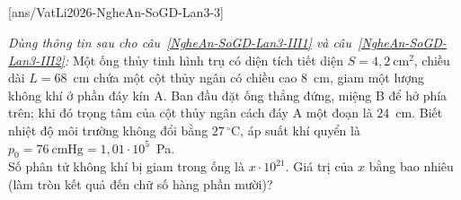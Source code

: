 	\subsection*{}
	\setcounter{ex}{0}
	[ans/VatLi2026-NgheAn-SoGD-Lan3-3]

	\begin{ex}%
		\label{NgheAn-SoGD-Lan3-III1}\textit{Dùng thông tin sau cho câu~\ref{NgheAn-SoGD-Lan3-III1} và câu~\ref{NgheAn-SoGD-Lan3-III2}:} Một ống thủy tinh hình trụ có diện tích tiết diện $S=4{,}2~\text{cm}^2$, chiều dài $L=68$~cm chứa một cột thủy ngân có chiều cao $8$~cm, giam một lượng không khí ở phần đáy kín A. Ban đầu đặt ống thẳng đứng, miệng B để hở phía trên; khi đó trọng tâm của cột thủy ngân cách đáy A một đoạn là $24$~cm. Biết nhiệt độ môi trường không đổi bằng $27\,^\circ\text{C}$, áp suất khí quyển là $p_0=76~\text{cmHg}=1{,}01\cdot 10^5$~Pa.\\
		Số phân tử không khí bị giam trong ống là $x\cdot 10^{21}$. Giá trị của $x$ bằng bao nhiêu (làm tròn kết quả đến chữ số hàng phần mười)?
		\par
	\end{ex}

